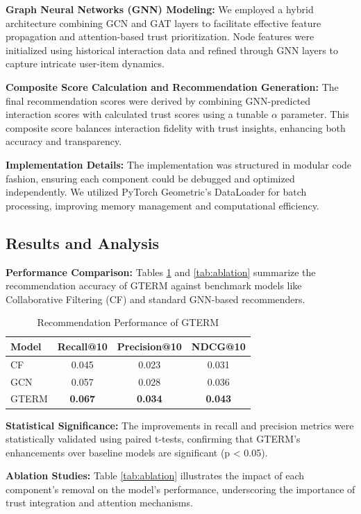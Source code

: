 \textbf{Graph Neural Networks (GNN) Modeling:} We employed a hybrid architecture combining GCN and GAT layers to facilitate effective feature propagation and attention-based trust prioritization. Node features were initialized using historical interaction data and refined through GNN layers to capture intricate user-item dynamics.

\textbf{Composite Score Calculation and Recommendation Generation:} The final recommendation scores were derived by combining GNN-predicted interaction scores with calculated trust scores using a tunable \(\alpha\) parameter. This composite score balances interaction fidelity with trust insights, enhancing both accuracy and transparency.

\textbf{Implementation Details:} The implementation was structured in modular code fashion, ensuring each component could be debugged and optimized independently. We utilized PyTorch Geometric's DataLoader for batch processing, improving memory management and computational efficiency.

\subsection{Results and Analysis}

\textbf{Performance Comparison:} Tables \ref{tab:performance} and \ref{tab:ablation} summarize the recommendation accuracy of GTERM against benchmark models like Collaborative Filtering (CF) and standard GNN-based recommenders.



\begin{table}[h] 
\centering 
\label{tab:performance} 
\begin{tabular}{lccc} 
\hline Model & Recall@10 & Precision@10 & NDCG@10 \\ 
\hline 
CF & 0.045 & 0.023 & 0.031 \\ 
GCN & 0.057 & 0.028 & 0.036 \\ 
GTERM & \textbf{0.067} & \textbf{0.034} & \textbf{0.043} \\ 
\hline 
\end{tabular} 
\caption{Recommendation Performance of GTERM} 
\end{table}
\textbf{Statistical Significance:} The improvements in recall and precision metrics were statistically validated using paired t-tests, confirming that GTERM's enhancements over baseline models are significant (p < 0.05).

\textbf{Ablation Studies:} Table \ref{tab:ablation} illustrates the impact of each component's removal on the model's performance, underscoring the importance of trust integration and attention mechanisms.


